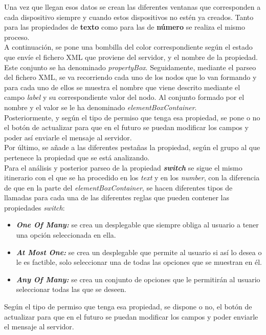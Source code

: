Una vez que llegan esos datos se crean las diferentes ventanas que corresponden a cada dispositivo siempre y cuando estos dispositivos no estén ya creados.
Tanto para las propiedades de \textbf{texto} como para las de \textbf{número} se realiza el mismo proceso.\\

A continuación, se pone una bombilla del color correspondiente según el estado que envíe el fichero XML que proviene del servidor, y el nombre de la propiedad. Este conjunto se ha denominado \textit{propertyBox}.
Seguidamente, mediante el parseo del fichero XML, se va recorriendo cada uno de los nodos que lo van formando y para cada uno de ellos se muestra el nombre que viene descrito mediante el campo \textit{label} y su correspondiente valor del nodo. Al conjunto formado por el nombre y el valor se le ha denominado \textit{elementBoxContainer}.\\

Posteriormente, y según el tipo de permiso que tenga esa propiedad, se pone o no el botón de actualizar para que en el futuro se puedan modificar los campos y poder así enviarle el mensaje al servidor.\\

Por último, se añade a las diferentes pestañas la propiedad, según el grupo al que pertenece la propiedad que se está analizando.\\

Para el análisis y posterior parseo de la propiedad \textbf{\textit{switch}} se sigue el mismo itinerario con el que se ha procedido en los \textit{text} y en los \textit{number}, con la diferencia de que en la parte del \textit{elementBoxContainer}, se hacen diferentes tipos de llamadas para cada una de las diferentes reglas  que pueden contener las propiedades \textit{switch}:
\begin{itemize}
  \item \textbf{\textit{One Of Many:}} se crea un desplegable que siempre obliga al usuario a tener una opción seleccionada en ella.
  \item \textbf{\textit{At Most One:}} se crea un desplegable que permite al usuario si así lo desea o le es factible, solo seleccionar una de todas las opciones que se muestran en él.
  \item \textbf{\textit{Any Of Many:}} se crea un conjunto de opciones que le permitirán al usuario seleccionar todas las que se deseen.
\end{itemize}
Según el tipo de permiso que tenga esa propiedad, se dispone o no, el botón de actualizar para que en el futuro se puedan modificar los campos y poder enviarle el mensaje al servidor.\\

